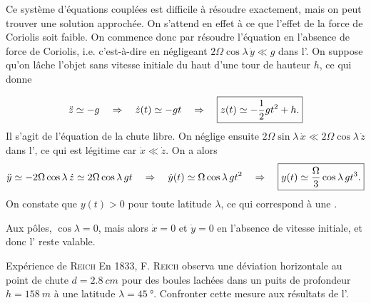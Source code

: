 \documentclass[12pt,fancy]{cours}
\begin{document}
Ce système d'équations couplées est difficile à résoudre exactement, mais on peut trouver une solution approchée. On s'attend en effet à ce que l'effet de la force de Coriolis soit faible. On commence donc par résoudre l'équation en l'absence de force de Coriolis, i.e. c'est-à-dire en négligeant $2\Omega \cos \lambda \,\dot{y} \ll g$ dans l'. On suppose qu'on lâche l'objet sans vitesse initiale du haut d'une tour de hauteur $h$, ce qui donne

\begin{equation}\label{eq:zddot}
  \ddot{z} \simeq -g \quad \Rightarrow \quad \dot{z}(t) \simeq -gt \quad \Rightarrow \quad \boxed{z(t) \simeq -\frac{1}{2}gt^{2} + h.}
\end{equation}
Il s'agit de l'équation de la chute libre. On néglige ensuite $2\Omega\sin\lambda\,\dot{x}\ll 2 \Omega\cos\lambda\,\dot{z}$ dans l', ce qui est légitime car $\dot{x} \ll \dot{z}$.
On a alors
\begin{equation}\label{eq:ydev}
  \ddot{y} \simeq -2\Omega \cos\lambda\,\dot{z} \simeq 2\Omega \cos\lambda\,gt \quad \Rightarrow \quad \dot{y}(t) \simeq \Omega\cos\lambda\, gt^2 \quad \Rightarrow \quad
\boxed{y(t) \simeq \frac{\Omega}{3}\cos\lambda\, gt^{3}.}
\end{equation}
On constate que $y(t)>0$ pour toute latitude $\lambda$, ce qui correspond à une .
\begin{remarque}
  Aux pôles, $\cos \lambda = 0$, mais alors $\dot{x}=0$ et $\dot{y}=0$ en l'absence de vitesse initiale, et donc l' reste valable.
\end{remarque}

\begin{exemple}{Expérience de \textsc{Reich}}
En 1833, F. \textsc{Reich} observa une déviation horizontale au point de chute $d=\SI{2.8}{cm}$ pour des boules lachées dans un puits de profondeur $h=\SI{158}{m}$ à une latitude $\lambda=\SI{45}{\degree}$. Confronter cette mesure aux résultats de l'.
\end{exemple}
\end{document}
